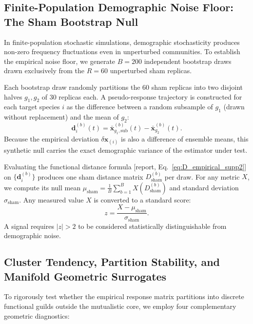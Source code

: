 \documentclass[11pt,a4paper]{article}
\newcommand{\R}[1]{\textcolor{blue!55!black}{[report, #1]}}
\begin{document}
\subsection{Finite-Population Demographic Noise Floor: The Sham Bootstrap Null}

In finite-population stochastic simulations, demographic stochasticity produces non-zero frequency fluctuations even in unperturbed communities. To establish the empirical noise floor, we generate $B = 200$ independent bootstrap draws drawn exclusively from the $R = 60$ unperturbed sham replicas.

Each bootstrap draw randomly partitions the 60 sham replicas into two disjoint halves $g_1, g_2$ of 30 replicas each. A pseudo-response trajectory is constructed for each target species $i$ as the difference between a random subsample of $g_1$ (drawn without replacement) and the mean of $g_2$:
\begin{equation}
\mathbf{d}_i^{(b)}(t) = \bar{\mathbf{x}}_{g_1, \mathrm{sub}}^{(b)}(t) - \bar{\mathbf{x}}_{g_2}^{(b)}(t).
\end{equation}
Because the empirical deviation $\delta\mathbf{x}_{(i)}$ is also a difference of ensemble means, this synthetic null carries the exact demographic variance of the estimator under test.

Evaluating the functional distance formula \R{Eq.~\ref{eq:D_empirical_supp2}} on $\{\mathbf{d}_i^{(b)}\}$ produces one sham distance matrix $D_{\mathrm{sham}}^{(b)}$ per draw. For any metric $X$, we compute its null mean $\mu_{\mathrm{sham}} = \frac{1}{B} \sum_{b=1}^B X(D_{\mathrm{sham}}^{(b)})$ and standard deviation $\sigma_{\mathrm{sham}}$. Any measured value $X$ is converted to a standard score:
\begin{equation}
z = \frac{X - \mu_{\mathrm{sham}}}{\sigma_{\mathrm{sham}}}.
\end{equation}
A signal requires $|z| > 2$ to be considered statistically distinguishable from demographic noise.

\subsection{Cluster Tendency, Partition Stability, and Manifold Geometric Surrogates}

To rigorously test whether the empirical response matrix partitions into discrete functional guilds outside the mutualistic core, we employ four complementary geometric diagnostics:
\end{document}
